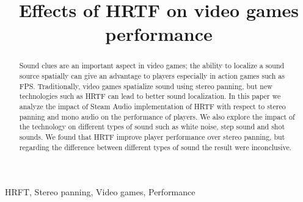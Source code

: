 \documentclass[conference]{IEEEtran}
\begin{document}
\title{Effects of HRTF on video games performance\\}

\author{
}

\maketitle

\begin{abstract}
Sound clues are an important aspect in video games; the ability to localize a sound source spatially can give an advantage to players especially in action games such as FPS. Traditionally, video games spatialize sound using stereo panning, but new technologies such as HRTF can lead to better sound localization. In this paper we analyze the impact of Steam Audio implementation of HRTF with respect to stereo panning and mono audio on the performance of players. We also explore the impact of the technology on different types of sound such as white noise, step sound and shot sounds.
We found that HRTF improve player performance over stereo panning, but regarding the difference between different types of sound the result were inconclusive.
\end{abstract}

\begin{IEEEkeywords}
HRFT, Stereo panning, Video games, Performance
\end{IEEEkeywords}
\end{document}
